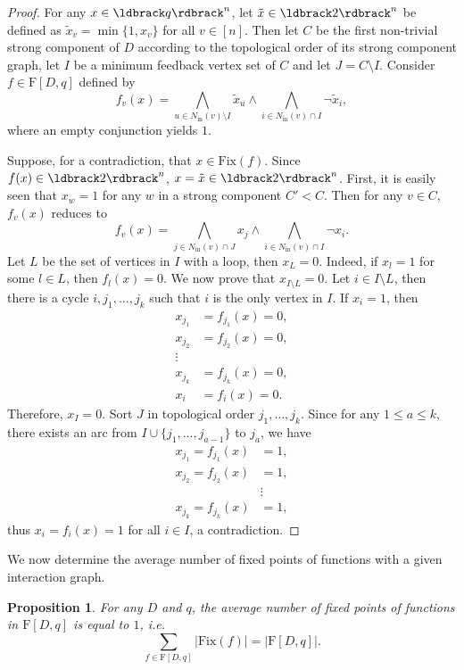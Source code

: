 \documentclass[a4paper, 11pt]{book}
\numberwithin{equation}{section}
\theoremstyle{plain}
\newtheorem{proposition}[equation]	{Proposition}
\newcommand{\neighbourhood}{N}
\newcommand{\inn}[1]{#1_\mathrm{in}}
\newcommand{\NIn}{\inn{\neighbourhood}}
\newcommand{\functions}{\mathrm{F}}
\newcommand{\Fix}{\mathrm{Fix}}
\renewcommand{\(}{\ldbrack}
\renewcommand{\)}{\rdbrack}
\begin{document}
\begin{proof}
For any $x \in \(q\)^n$, let $\tilde x \in \(2\)^n$ be defined as $\tilde x_v = \min\{1, x_v\}$ for all $v \in [n]$. Then let $C$ be the first non-trivial strong component of $D$ according to the topological order of its strong component graph, let $I$ be a minimum feedback vertex set of $C$ and let $J = C \setminus I$. Consider $f \in \functions[D,q]$ defined by 
\[
	f_v(x) = \bigwedge_{u \in \NIn(v) \setminus I} \tilde x_u \land \bigwedge_{i \in \NIn(v) \cap I} \neg \tilde x_i,
\]
where an empty conjunction yields $1$.

Suppose, for a contradiction, that $x \in \Fix(f)$. Since $f(x) \in \(2\)^n$, $x = \tilde x \in \(2\)^n$. First, it is easily seen that $x_w = 1$ for any $w$ in a strong component $C' < C$. Then for any $v \in C$, $f_v(x)$ reduces to
\[
	f_v(x) = \bigwedge_{j \in \NIn(v) \cap J} x_j \land \bigwedge_{i \in \NIn(v) \cap I} \neg x_i.
\]
Let $L$ be the set of vertices in $I$ with a loop, then $x_L = 0$. Indeed, if $x_l = 1$ for some $l  \in L$, then $f_l(x) = 0$. We now prove that $x_{I \setminus L} = 0$. Let $i \in I \setminus L$, then there is a cycle $i, j_1, \dots, j_k$ such that $i$ is the only vertex in $I$. If $x_i = 1$, then 
\begin{align*}
	x_{j_1} &= f_{j_1}(x) = 0,\\
	x_{j_2} &= f_{j_2}(x) = 0,\\
	\vdots\\
	x_{j_k} &= f_{j_k}(x) = 0,\\
	x_i &= f_i(x) = 0.
\end{align*}
Therefore, $x_I = 0$. Sort $J$ in topological order $j_1, \dots, j_k$. Since for any $1 \le a \le k$, there exists an arc from $I \cup \{j_1, \dots, j_{a-1}\}$ to $j_a$, we have
\begin{align*}
	x_{j_1} = f_{j_1}(x) &= 1,\\
	x_{j_2} = f_{j_2}(x) &= 1,\\
	&\vdots\\
	x_{j_k} = f_{j_k}(x) &= 1,
\end{align*}
thus $x_i = f_i(x) = 1$ for all $i \in I$, a contradiction.
\end{proof}


We now determine the average number of fixed points of functions with a given interaction graph.


\begin{proposition} \label{prop:average_fixed_points}
For any $D$ and $q$, the average number of fixed points of functions in $\functions[D,q]$ is equal to $1$, i.e.
\[
	\sum_{f \in \functions[D,q]} |\Fix(f)| = |\functions[D,q]|. 
\]
\end{proposition}
\end{document}
